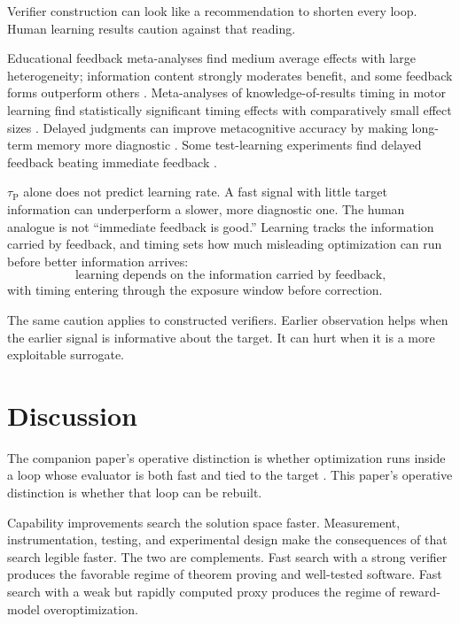 \documentclass[11pt]{article}
\newcommand{\tauP}{\tau_{\mathrm{P}}}
\begin{document}
Verifier construction can look like a recommendation to shorten every loop. Human learning results caution against that reading.

Educational feedback meta-analyses find medium average effects with large heterogeneity; information content strongly moderates benefit, and some feedback forms outperform others \parencite{wisniewski2020feedback}. Meta-analyses of knowledge-of-results timing in motor learning find statistically significant timing effects with comparatively small effect sizes \parencite{travlos1995timing}. Delayed judgments can improve metacognitive accuracy by making long-term memory more diagnostic \parencite{rhodes2011delayed}. Some test-learning experiments find delayed feedback beating immediate feedback \parencite{butler2008feedback}.

\(\tauP\) alone does not predict learning rate. A fast signal with little target information can underperform a slower, more diagnostic one. The human analogue is not ``immediate feedback is good.'' Learning tracks the information carried by feedback, and timing sets how much misleading optimization can run before better information arrives:
\[
\text{learning depends on the information carried by feedback,}
\]
with timing entering through the exposure window before correction.

The same caution applies to constructed verifiers. Earlier observation helps when the earlier signal is informative about the target. It can hurt when it is a more exploitable surrogate.



\section{Discussion}

The companion paper's operative distinction is whether optimization runs inside a loop whose evaluator is both fast and tied to the target \parencite{zarncke2026feedbackhorizon}. This paper's operative distinction is whether that loop can be rebuilt.

Capability improvements search the solution space faster. Measurement, instrumentation, testing, and experimental design make the consequences of that search legible faster. The two are complements. Fast search with a strong verifier produces the favorable regime of theorem proving and well-tested software. Fast search with a weak but rapidly computed proxy produces the regime of reward-model overoptimization.
\end{document}

